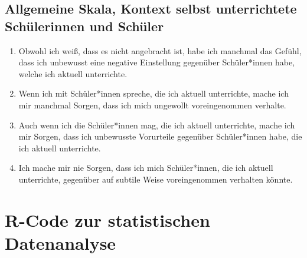 \section*{Allgemeine Skala, Kontext selbst unterrichtete Schülerinnen und Schüler}
\label{app:skala-allg-eigene-sus}

\begin{enumerate}
	\item Obwohl ich weiß, dass es nicht angebracht ist, habe ich manchmal das Gefühl, dass ich unbewusst eine negative Einstellung gegenüber Schüler*innen habe, welche ich aktuell unterrichte.
	
	\item Wenn ich mit Schüler*innen spreche, die ich aktuell unterrichte, mache ich mir manchmal Sorgen, dass ich mich ungewollt voreingenommen verhalte.
	
	\item Auch wenn ich die Schüler*innen mag, die ich aktuell unterrichte, mache ich mir Sorgen, dass ich unbewusste Vorurteile gegenüber Schüler*innen habe, die ich aktuell unterrichte.
	
	\item Ich mache mir nie Sorgen, dass ich mich Schüler*innen, die ich aktuell unterrichte, gegenüber auf subtile Weise voreingenommen verhalten könnte.
\end{enumerate}



\chapter{R-Code zur statistischen Datenanalyse}
\label{app:r-code}

